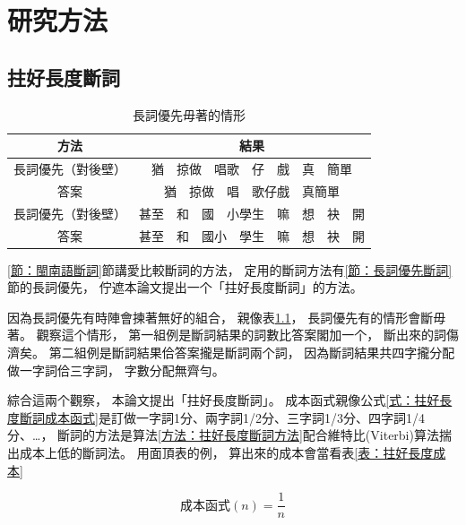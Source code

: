 \chapter{研究方法}
\label{章：研究方法}

\section{拄好長度斷詞}
\label{節：拄好長度斷詞}

\begin{table}
\caption{長詞優先毋著的情形}
\label{表：長詞優先佇一寡例有問題}
\centering
\begin{tabular}{c|c}
方法 & 結果\\
\hline
長詞優先（對後壁） & 猶　掠做　唱歌　仔　戲　真　簡單\\
答案 & 猶　掠做　唱　歌仔戲　真簡單\\
\hline
長詞優先（對後壁） & 甚至　和　國　小學生　嘛　想　袂　開\\
答案 & 甚至　和　國小　學生　嘛　想　袂　開\\
\end{tabular}
\end{table}

\ref{節：閩南語斷詞}節講愛比較斷詞的方法，
定用的斷詞方法有\ref{節：長詞優先斷詞}節的長詞優先，
佇遮本論文提出一个「拄好長度斷詞」的方法。


因為長詞優先有時陣會揀著無好的組合，
親像表\ref{表：長詞優先佇一寡例有問題}，
長詞優先有的情形會斷毋著。
觀察這个情形，
第一組例是斷詞結果的詞數比答案閣加一个，
斷出來的詞傷濟矣。
第二組例是斷詞結果佮答案攏是斷詞兩个詞，
因為斷詞結果共四字攏分配做一字詞佮三字詞，
字數分配無齊勻。

綜合這兩个觀察，
本論文提出「拄好長度斷詞」。
成本函式親像公式\ref{式：拄好長度斷詞成本函式}是訂做一字詞1分、兩字詞1/2分、三字詞1/3分、四字詞1/4分、…，
斷詞的方法是算法\ref{方法：拄好長度斷詞方法}配合維特比(Viterbi)算法揣出成本上低的斷詞法。
用面頂表的例，
算出來的成本會當看表\ref{表：拄好長度成本}

\begin{equation}
\label{式：拄好長度斷詞成本函式}
成本函式(n) = \frac{1}{n}
\end{equation}

